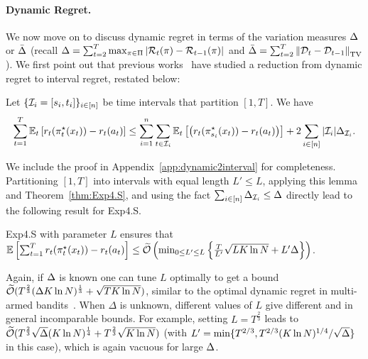 \paragraph{Dynamic Regret.}
We now move on to discuss dynamic regret in terms of the variation measures $\Delta$ or $\bar{\Delta}$ (recall $\Delta = \sum_{t=2}^T \max_{\pi \in \Pi} |{\mathcal{R}}_t(\pi) - {\mathcal{R}}_{t-1}(\pi)|$ and $\bar{\Delta} = \sum_{t=2}^T \left\|{{\mathcal{D}}_t-{\mathcal{D}}_{t-1}}\right\|_\text{TV}$). %
We first point out that previous
works~\citep{BesbesGuZe15, ZhangYaJiZh17} have studied a reduction
from dynamic regret to interval regret, restated below:

\begin{lemma}\label{lem:dynamic2interval}
Let $\{{\mathcal{I}}_i = [s_i, t_i]\}_{i \in [n]}$ be time intervals that partition $[1,T]$. 
We have 
\[
\sum_{t=1}^T \mathbb{E}_t\left[ r_t(\pi^\star_t(x_t)) - r_t(a_t) \right] \leq
\sum_{i=1}^n \sum_{t\in{\mathcal{I}}_i} \mathbb{E}_t\left[ \left(
  r_t(\pi^\star_{s_i}(x_t)) - r_t(a_t) \right)\right] +
2\sum_{i\in[n]} |{\mathcal{I}}_i|\Delta_{{\mathcal{I}}_i}.
\]
\end{lemma}

We include the proof in Appendix~\ref{app:dynamic2interval} for
completeness.  Partitioning $[1,T]$ into intervals with equal length $L'
\leq L$, applying this lemma and Theorem~\ref{thm:Exp4.S},
and using the fact $\sum_{i\in[n]} \Delta_{{\mathcal{I}}_i} \leq \Delta$ directly
lead to the following result for Exp4.S.

\begin{cor}\label{thm:Exp4.S_dynamic}
Exp4.S with parameter $L$ ensures that $\mathbb{E}\left[ \sum_{t=1}^T
  r_t(\pi^\star_t(x_t)) - r_t(a_t) \right] \leq \widetilde{\mathcal{O}}\left(\min_{0\leq
  L' \leq L} \left\{\frac{T}{L'}\sqrt{LK\ln N} + L'\Delta\right\} \right)$.
\end{cor}

Again, if $\Delta$ is known one can tune $L$
optimally to get a bound $\widetilde{\mathcal{O}}(T^\frac{2}{3}(\Delta K\ln
N)^\frac{1}{3} + \sqrt{TK\ln N})$, similar to the optimal
dynamic regret in multi-armed bandits~\citep{BesbesGuZe14}.  When
$\Delta$ is unknown, different values of $L$ give different and in
general incomparable bounds.  For example, setting $L =
T^\frac{2}{3}$ leads to $\widetilde{\mathcal{O}}(T^\frac{2}{3}\sqrt{\Delta}(K\ln
N)^\frac{1}{4} +T^\frac{2}{3}\sqrt{K\ln N})$
(with $L' = \min\{T^{2/3}, T^{2/3}(K\ln N)^{1/4}/\sqrt{\Delta}\}$ in this case),
which is again vacuous for large $\Delta$.

